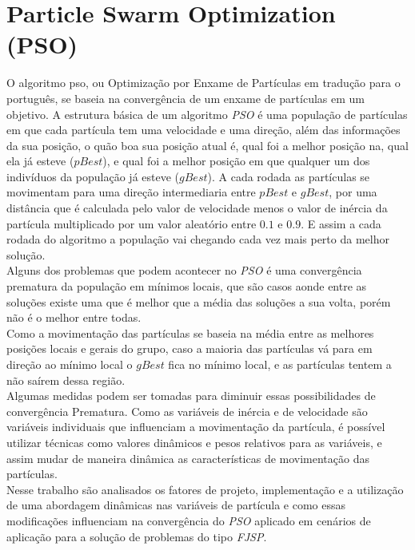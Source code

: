 \section{Particle Swarm Optimization (PSO)}
\indent O algoritmo \gls{pso}, ou Optimização por Enxame de Partículas em tradução para o português, se baseia na convergência de um enxame de partículas em um objetivo.
A estrutura básica de um algoritmo \textit{PSO} é uma população de partículas em que cada partícula tem uma velocidade e uma direção, além das informações da sua posição, o quão boa sua posição atual é, qual foi a melhor posição na, qual ela já esteve ($pBest$), e qual foi a melhor posição em que qualquer um dos indivíduos da população já esteve ($gBest$).
A cada rodada as partículas se movimentam para uma direção intermediaria entre $pBest$ e $gBest$, por uma distância que é calculada pelo valor de velocidade menos o valor de inércia da partícula multiplicado por um valor aleatório entre $0.1$ e $0.9$. 
E assim a cada rodada do algoritmo a população vai chegando cada vez mais perto da melhor solução.\\
\indent Alguns dos problemas que podem acontecer no \textit{PSO} é uma convergência prematura da população em mínimos locais,
que são casos aonde entre as soluções existe uma que é melhor que a média das soluções a sua volta, porém não é o melhor entre todas.\\
Como a movimentação das partículas se baseia na média entre as melhores posições locais e gerais do grupo, caso a maioria das partículas vá para em direção ao mínimo local o $gBest$ fica no mínimo local, e as partículas tentem a não saírem dessa região.\\
\indent Algumas medidas podem ser tomadas para diminuir essas possibilidades de convergência Prematura.
Como as variáveis de inércia e de velocidade são variáveis individuais que influenciam a movimentação da partícula, é possível utilizar técnicas como valores dinâmicos e pesos relativos para as variáveis, e assim mudar de maneira dinâmica as características de movimentação das partículas.\\
\indent Nesse trabalho são analisados os fatores de projeto, implementação e a utilização de uma abordagem dinâmicas nas variáveis de partícula e como essas modificações influenciam na convergência do \textit{PSO} aplicado em cenários de aplicação para a solução de problemas do tipo \textit{FJSP}.

